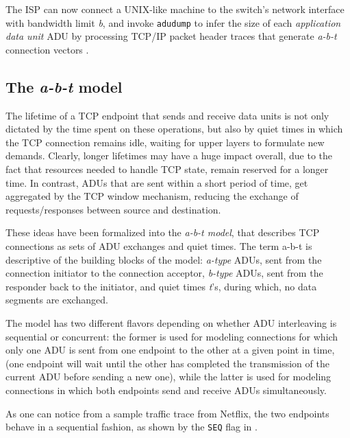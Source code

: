 The ISP can now connect a UNIX-like machine to the switch's network interface
with bandwidth limit \emph{b}, and invoke \texttt{adudump} to infer the size of
each \emph{application data unit} ADU by processing TCP/IP packet header
traces that generate \emph{a-b-t} connection vectors \cite{hernandez}.

\subsection{The \emph{a-b-t} model}

The lifetime of a TCP endpoint that sends and receive data units is not only
dictated by the time spent on these operations, but also by quiet times in
which the TCP connection remains idle, waiting for upper layers to formulate
new demands. Clearly, longer lifetimes may have a huge impact overall, due to
the fact that resources needed to handle TCP state, remain reserved for a
longer time. In contrast, ADUs that are sent within a short period of time, get
aggregated by the TCP window mechanism, reducing the exchange of
requests/responses between source and destination.

These ideas have been formalized into the \emph{a-b-t model}, that describes
TCP connections as sets of ADU exchanges and quiet times. The term a-b-t is
descriptive of the building blocks of the model: \emph{a-type} ADUs, sent from
the connection initiator to the connection acceptor, \emph{b-type} ADUs, sent
from the responder back to the initiator, and quiet times \emph{t}'s, during
which, no data segments are exchanged.

The model has two different flavors depending on whether ADU interleaving is
sequential or concurrent: the former is used for modeling connections for which
only one ADU is sent from one endpoint to the other at a given point in time,
(one endpoint will wait until the other has completed the transmission of the
current ADU before sending a new one), while the latter is used for modeling
connections in which both endpoints send and receive ADUs simultaneously.

As one can notice from a sample traffic trace from Netflix, the two endpoints
behave in a sequential fashion, as shown by the \texttt{SEQ} flag in
.

